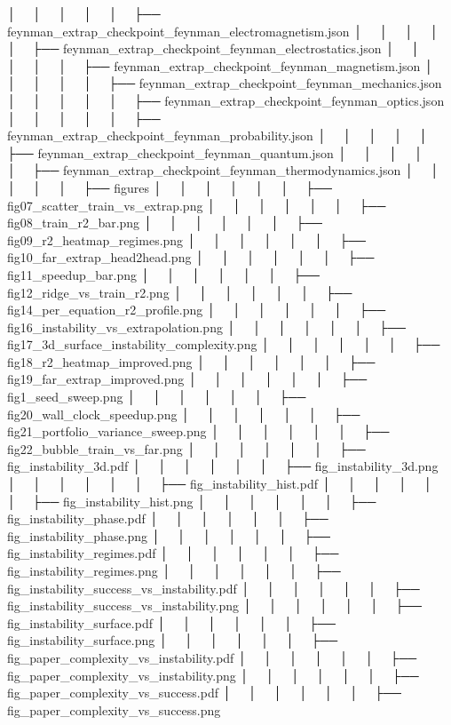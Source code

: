 │   │       │   │   │   ├── feynman_extrap_checkpoint_feynman_electromagnetism.json
│   │       │   │   │   ├── feynman_extrap_checkpoint_feynman_electrostatics.json
│   │       │   │   │   ├── feynman_extrap_checkpoint_feynman_magnetism.json
│   │       │   │   │   ├── feynman_extrap_checkpoint_feynman_mechanics.json
│   │       │   │   │   ├── feynman_extrap_checkpoint_feynman_optics.json
│   │       │   │   │   ├── feynman_extrap_checkpoint_feynman_probability.json
│   │       │   │   │   ├── feynman_extrap_checkpoint_feynman_quantum.json
│   │       │   │   │   ├── feynman_extrap_checkpoint_feynman_thermodynamics.json
│   │       │   │   │   ├── figures
│   │       │   │   │   │   ├── fig07_scatter_train_vs_extrap.png
│   │       │   │   │   │   ├── fig08_train_r2_bar.png
│   │       │   │   │   │   ├── fig09_r2_heatmap_regimes.png
│   │       │   │   │   │   ├── fig10_far_extrap_head2head.png
│   │       │   │   │   │   ├── fig11_speedup_bar.png
│   │       │   │   │   │   ├── fig12_ridge_vs_train_r2.png
│   │       │   │   │   │   ├── fig14_per_equation_r2_profile.png
│   │       │   │   │   │   ├── fig16_instability_vs_extrapolation.png
│   │       │   │   │   │   ├── fig17_3d_surface_instability_complexity.png
│   │       │   │   │   │   ├── fig18_r2_heatmap_improved.png
│   │       │   │   │   │   ├── fig19_far_extrap_improved.png
│   │       │   │   │   │   ├── fig1_seed_sweep.png
│   │       │   │   │   │   ├── fig20_wall_clock_speedup.png
│   │       │   │   │   │   ├── fig21_portfolio_variance_sweep.png
│   │       │   │   │   │   ├── fig22_bubble_train_vs_far.png
│   │       │   │   │   │   ├── fig_instability_3d.pdf
│   │       │   │   │   │   ├── fig_instability_3d.png
│   │       │   │   │   │   ├── fig_instability_hist.pdf
│   │       │   │   │   │   ├── fig_instability_hist.png
│   │       │   │   │   │   ├── fig_instability_phase.pdf
│   │       │   │   │   │   ├── fig_instability_phase.png
│   │       │   │   │   │   ├── fig_instability_regimes.pdf
│   │       │   │   │   │   ├── fig_instability_regimes.png
│   │       │   │   │   │   ├── fig_instability_success_vs_instability.pdf
│   │       │   │   │   │   ├── fig_instability_success_vs_instability.png
│   │       │   │   │   │   ├── fig_instability_surface.pdf
│   │       │   │   │   │   ├── fig_instability_surface.png
│   │       │   │   │   │   ├── fig_paper_complexity_vs_instability.pdf
│   │       │   │   │   │   ├── fig_paper_complexity_vs_instability.png
│   │       │   │   │   │   ├── fig_paper_complexity_vs_success.pdf
│   │       │   │   │   │   ├── fig_paper_complexity_vs_success.png
